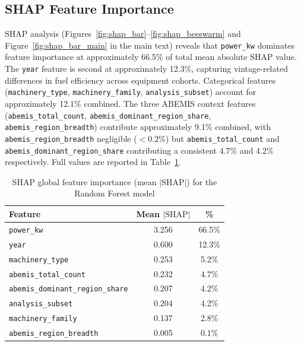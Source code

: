 \documentclass[conference]{IEEEtran}
\begin{document}
\subsection{SHAP Feature Importance}

SHAP analysis (Figures~\ref{fig:shap_bar}--\ref{fig:shap_beeswarm} and Figure~\ref{fig:shap_bar_main} in the main text) reveals that \texttt{power\_kw} dominates feature importance at approximately 66.5\% of total mean absolute SHAP value. The \texttt{year} feature is second at approximately 12.3\%, capturing vintage-related differences in fuel efficiency across equipment cohorts. Categorical features (\texttt{machinery\_type}, \texttt{machinery\_family}, \texttt{analysis\_subset}) account for approximately 12.1\% combined. The three ABEMIS context features (\texttt{abemis\_total\_count}, \texttt{abemis\_dominant\_region\_share}, \texttt{abemis\_region\_breadth}) contribute approximately 9.1\% combined, with \texttt{abemis\_region\_breadth} negligible ($< 0.2\%$) but \texttt{abemis\_total\_count} and \texttt{abemis\_dominant\_region\_share} contributing a consistent 4.7\% and 4.2\% respectively. Full values are reported in Table~\ref{tab:shap}.

\begin{table}[H]
\centering

\caption{SHAP global feature importance (mean $|\text{SHAP}|$) for the Random Forest model}
\label{tab:shap}
\footnotesize
\begin{tabular}{lcc}
\toprule
\textbf{Feature} & \textbf{Mean $|\text{SHAP}|$} & \textbf{\%} \\
\midrule
\texttt{power\_kw}                      & 3.256 & 66.5\% \\
\texttt{year}                           & 0.600 & 12.3\% \\
\texttt{machinery\_type}                & 0.253 & 5.2\% \\
\texttt{abemis\_total\_count}           & 0.232 & 4.7\% \\
\texttt{abemis\_dominant\_region\_share}& 0.207 & 4.2\% \\
\texttt{analysis\_subset}               & 0.204 & 4.2\% \\
\texttt{machinery\_family}              & 0.137 & 2.8\% \\
\texttt{abemis\_region\_breadth}        & 0.005 & 0.1\% \\
\bottomrule
\end{tabular}
\end{table}
\end{document}
